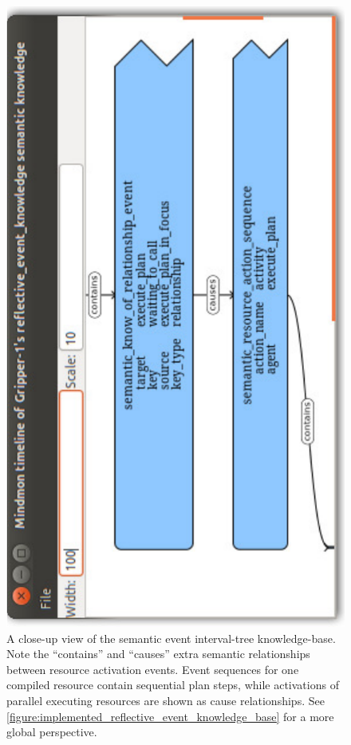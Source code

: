 \begin{figure}
\begin{center}
\hspace*{-3cm}\includegraphics[width=15cm]{gfx/implemented_semantic_event_knowledge_base}
\end{center}
\caption[A close-up view of the semantic event interval-tree
  knowledge-base.]{A close-up view of the semantic event interval-tree
  knowledge-base.  Note the ``contains'' and ``causes'' extra semantic
  relationships between resource activation events.  Event sequences
  for one compiled resource contain sequential plan steps, while
  activations of parallel executing resources are shown as cause
  relationships.  See
  {\mbox{\autoref{figure:implemented_reflective_event_knowledge_base}}}
  for a more global perspective.}
\label{figure:implemented_semantic_event_knowledge_base}
\end{figure}

